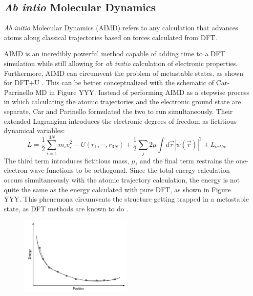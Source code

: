 \documentclass[3p,review,12pt]{elsarticle}
\begin{document}
\subsection{\emph{Ab intio} Molecular Dynamics}
\emph{Ab initio} Molecular Dynamics (AIMD) refers to any calculation that advances atoms along classical trajectories based on forces calculated from DFT\cite{Sholl2009}.
\par 
AIMD is an incredibly powerful method capable of adding time to a DFT simulation while still allowing for \emph{ab initio} calculation of electronic properties. Furthermore, AIMD can circumvent the problem of metastable states, as shown for DFT+U \cite{Zhang2015}. This can be better conceptualized with the schematic of Car-Parrinello MD in Figure YYY. Instead of performing AIMD as a stepwise process in which calculating the atomic trajectories and the electronic ground state are separate, Car and Parinello formulated the two to run simultaneously. Their extended Lagrangian introduces the electronic degrees of freedom as fictitious dynamical variables:
\begin{equation}
L =\frac{1}{2}\sum_{i=1}^{3N}m_{i}v^{2}_{i}-U(r_{1}, \cdots, r_{3N})+\frac{1}{2}\sum_{j}2\mu \int d\vec{r}|\dot{\psi}(\vec{r})|^{2}+L_{ortho}
\end{equation}
The third term introduces fictitious mass, $\mu$, and the final term restrains the one-electron wave functions to be orthogonal. Since the total energy calculation occurs simultaneously with the atomic trajectory calculation, the energy is not quite the same as the energy calculated with pure DFT, as shown in Figure YYY. This phenemona circumvents the structure getting trapped in a metastable state, as DFT methods are known to do \cite{Dorado2013}.
\begin{figure}[h]
	\includegraphics[width=0.5\textwidth]{practical1}
	\centering
	\caption{} 
\end{figure}
\end{document}
